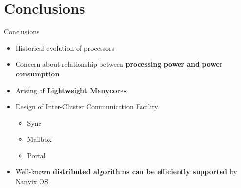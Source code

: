 \section{Conclusions}

	\begin{frame}[fragile]{Conclusions}
		\begin{itemize}
			\item Historical evolution of processors
			\item Concern about relationship between \textbf{processing power and power consumption}
			\item Arising of \textbf{Lightweight Manycores}
		\end{itemize}

		\begin{itemize}
			\item Design of Inter-Cluster Communication Facility
			\begin{itemize}
				\item Sync
				\item Mailbox
				\item Portal
			\end{itemize}
		\end{itemize}

		\begin{itemize}
			\item Well-known \textbf{distributed algorithms can be efficiently supported} by Nanvix OS
		\end{itemize}
		
	\end{frame}


